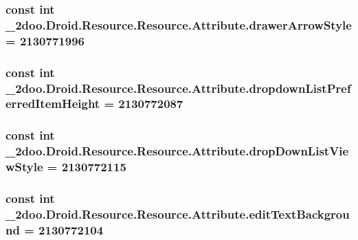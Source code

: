 \hypertarget{class__2doo_1_1_droid_1_1_resource_1_1_attribute_11c8d7c39fd3652d1156a4487908c456}{
\subsubsection[{drawerArrowStyle}]{\setlength{\rightskip}{0pt plus 5cm}const int \_\-2doo.Droid.Resource.Resource.Attribute.drawerArrowStyle = 2130771996}}
\label{class__2doo_1_1_droid_1_1_resource_1_1_attribute_11c8d7c39fd3652d1156a4487908c456}


\hypertarget{class__2doo_1_1_droid_1_1_resource_1_1_attribute_4f8a0f1ef4c30708e7ae6f460a3319dc}{
\subsubsection[{dropdownListPreferredItemHeight}]{\setlength{\rightskip}{0pt plus 5cm}const int \_\-2doo.Droid.Resource.Resource.Attribute.dropdownListPreferredItemHeight = 2130772087}}
\label{class__2doo_1_1_droid_1_1_resource_1_1_attribute_4f8a0f1ef4c30708e7ae6f460a3319dc}


\hypertarget{class__2doo_1_1_droid_1_1_resource_1_1_attribute_1bd835c4a2a32f99c2b7f97feedc519c}{
\subsubsection[{dropDownListViewStyle}]{\setlength{\rightskip}{0pt plus 5cm}const int \_\-2doo.Droid.Resource.Resource.Attribute.dropDownListViewStyle = 2130772115}}
\label{class__2doo_1_1_droid_1_1_resource_1_1_attribute_1bd835c4a2a32f99c2b7f97feedc519c}


\hypertarget{class__2doo_1_1_droid_1_1_resource_1_1_attribute_a9fa799a98e4dc5d306609a226238024}{
\subsubsection[{editTextBackground}]{\setlength{\rightskip}{0pt plus 5cm}const int \_\-2doo.Droid.Resource.Resource.Attribute.editTextBackground = 2130772104}}
\label{class__2doo_1_1_droid_1_1_resource_1_1_attribute_a9fa799a98e4dc5d306609a226238024}


